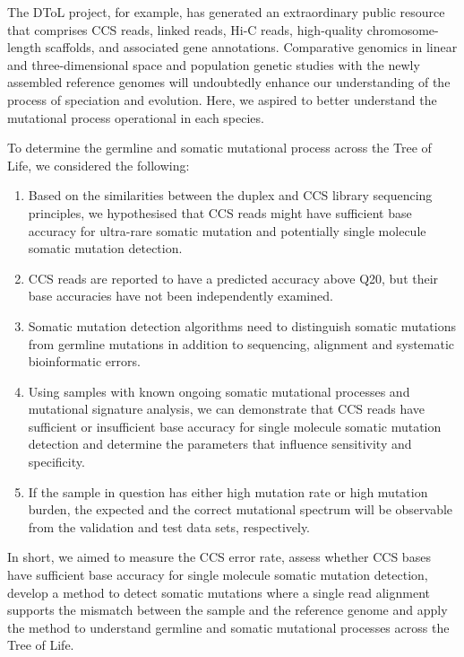 The DToL project, for example, has generated an extraordinary public resource that comprises CCS reads, linked reads, Hi-C reads, high-quality chromosome-length scaffolds, and associated gene annotations. Comparative genomics in linear and three-dimensional space and population genetic studies with the newly assembled reference genomes will undoubtedly enhance our understanding of the process of speciation and evolution. Here, we aspired to better understand the mutational process operational in each species.

To determine the germline and somatic mutational process across the Tree of Life, we considered the following:

\begin{enumerate}
\item Based on the similarities between the duplex\cite{Schmitt2012-yr} and CCS library sequencing \cite{Travers2010-sx} principles, we hypothesised that CCS reads might have sufficient base accuracy for ultra-rare somatic mutation and potentially single molecule somatic mutation detection.
\item CCS reads are reported to have a predicted accuracy above Q20, but their base accuracies have not been independently examined. 
\item Somatic mutation detection algorithms need to distinguish somatic mutations from germline mutations in addition to sequencing, alignment and systematic bioinformatic errors.
\item Using samples with known ongoing somatic mutational processes and mutational signature analysis, we can demonstrate that CCS reads have sufficient or insufficient base accuracy for single molecule somatic mutation detection and determine the parameters that influence sensitivity and specificity.
\item If the sample in question has either high mutation rate or high mutation burden, the expected and the correct mutational spectrum will be observable from the validation and test data sets, respectively. 
\end{enumerate} 

In short, we aimed to measure the CCS error rate, assess whether CCS bases have sufficient base accuracy for single molecule somatic mutation detection, develop a method to detect somatic mutations where a single read alignment supports the mismatch between the sample and the reference genome and apply the method to understand germline and somatic mutational processes across the Tree of Life. 

